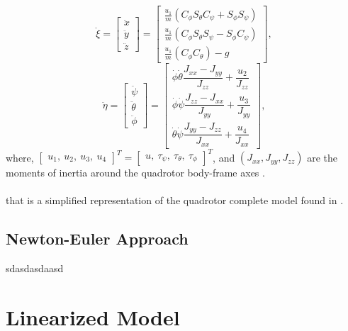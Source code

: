 \begin{equation}
\label{eqn:E-L1}
\ddot{\xi} =
\begin{bmatrix}
\ddot{x} \\ \ddot{y} \\ \ddot{z}
\end{bmatrix} 
=
\begin{bmatrix}
\frac{u_{1}}{m}(C_\phi S_\theta C_\psi + S_\phi S_\psi) \\
 \frac{u_{1}}{m}(C_\phi S_\theta S_\psi - S_\phi C_\psi) \\
\frac{u_{1}}{m}(C_\phi C_\theta) - g
\end{bmatrix},
\end{equation}
\begin{equation}
\label{eqn:E-L2}
\ddot{\eta} =
\begin{bmatrix}
\ddot{\psi} \\ \ddot{\theta} \\ \ddot{\phi}
\end{bmatrix} 
 =
\begin{bmatrix}
\dot{\phi}\dot{\theta}\dfrac{J_{xx}-J_{yy}}{J_{zz}} + \dfrac{u_{2}}{J_{zz}} \\
\dot{\phi}\dot{\psi}\dfrac{J_{zz}-J_{xx}}{J_{yy}} + \dfrac{u_{3}}{J_{yy}} \\
 \dot{\theta}\dot{\psi}\dfrac{J_{yy}-J_{zz}}{J_{xx}} +  \dfrac{u_{4}}{J_{xx}}
\end{bmatrix},
\end{equation}
where, $\begin{bmatrix}
u_{1},\ u_{2},\ u_{3}, \ u_{4}
\end{bmatrix}^{T} = \begin{bmatrix}
u,\ \tau_{\psi},\ \tau_{\theta},\ \tau_{\phi}
\end{bmatrix}^{T} $, and $ (J_{xx}, J_{yy}, J_{zz}) $ are the moments of inertia around the quadrotor body-frame axes \cite{Emam2016, Badr2016}.
\\\\

that is a simplified representation of the quadrotor complete model found in \cite{Bouabdallah2007}.

\subsection{Newton-Euler Approach}
sdasdasdaasd

\section{Linearized Model}
\label{sec:linearized}
\setcounter{MaxMatrixCols}{20}
